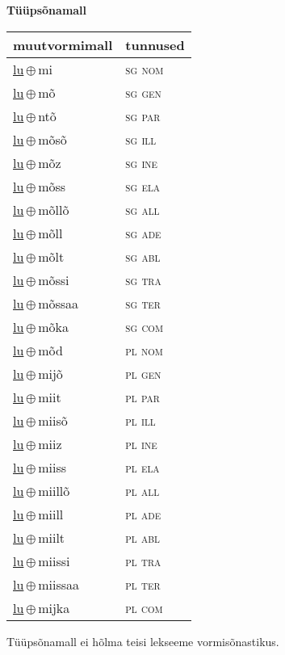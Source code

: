 

\vspace{3.5em}
\noindent \begin{minipage}{\textwidth}
\noindent \textbf{Tüüpsõnamall \,}\\

\begin{sideways}
\begin{tabular}{l l}
muutvormimall & tunnused \\
\hline
\underline{lu}\,$\oplus$\,mi & \textsc{ sg nom } \\
\underline{lu}\,$\oplus$\,mõ & \textsc{ sg gen } \\
\underline{lu}\,$\oplus$\,ntõ & \textsc{ sg par } \\
\underline{lu}\,$\oplus$\,mõsõ & \textsc{ sg ill } \\
\underline{lu}\,$\oplus$\,mõz & \textsc{ sg ine } \\
\underline{lu}\,$\oplus$\,mõss & \textsc{ sg ela } \\
\underline{lu}\,$\oplus$\,mõllõ & \textsc{ sg all } \\
\underline{lu}\,$\oplus$\,mõll & \textsc{ sg ade } \\
\underline{lu}\,$\oplus$\,mõlt & \textsc{ sg abl } \\
\underline{lu}\,$\oplus$\,mõssi & \textsc{ sg tra } \\
\underline{lu}\,$\oplus$\,mõssaa & \textsc{ sg ter } \\
\underline{lu}\,$\oplus$\,mõka & \textsc{ sg com } \\
\underline{lu}\,$\oplus$\,mõd & \textsc{ pl nom } \\
\underline{lu}\,$\oplus$\,mijõ & \textsc{ pl gen } \\
\underline{lu}\,$\oplus$\,miit & \textsc{ pl par } \\
\underline{lu}\,$\oplus$\,miisõ & \textsc{ pl ill } \\
\underline{lu}\,$\oplus$\,miiz & \textsc{ pl ine } \\
\underline{lu}\,$\oplus$\,miiss & \textsc{ pl ela } \\
\underline{lu}\,$\oplus$\,miillõ & \textsc{ pl all } \\
\underline{lu}\,$\oplus$\,miill & \textsc{ pl ade } \\
\underline{lu}\,$\oplus$\,miilt & \textsc{ pl abl } \\
\underline{lu}\,$\oplus$\,miissi & \textsc{ pl tra } \\
\underline{lu}\,$\oplus$\,miissaa & \textsc{ pl ter } \\
\underline{lu}\,$\oplus$\,mijka & \textsc{ pl com } \\
\end{tabular}
\end{sideways}
\label{tab:tüüpsõnamall-lumi}

\end{minipage}

 
\vspace{1em}
\noindent Tüüpsõnamall  ei hõlma teisi lekseeme vormi\-sõnastikus.
